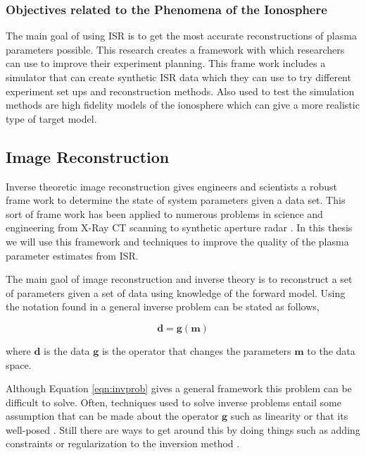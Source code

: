 \subsubsection{Objectives related to the Phenomena of the Ionosphere}
The main goal of using ISR is to get the most accurate reconstructions of plasma parameters possible. This research creates a framework with which researchers can use to improve their experiment planning. This frame work includes a simulator that can create synthetic ISR data which they can use to try different experiment set ups and reconstruction methods. Also used to test the simulation methods are high fidelity models of the ionosphere which can give a more realistic type of target model.

\subsection{Image Reconstruction}
Inverse theoretic image reconstruction gives engineers and scientists a robust frame work to determine the state of system parameters given a data set. This sort of frame work has been applied to numerous problems in science and engineering from X-Ray CT scanning \cite{kak1988principles} to synthetic aperture radar \cite{1456966}. In this thesis we will use this framework and techniques to improve the quality of the plasma parameter estimates from ISR.

The main gaol of image reconstruction and inverse theory is to reconstruct a set of parameters given a set of data using knowledge of the forward model. Using the notation found in \cite{menke2012geophysical} a general inverse problem can be stated as follows,

\begin{equation}
\label{eqn:invprob}
\mathbf{d}=\mathbf{g}(\mathbf{m})
\end{equation}

\noindent where $\mathbf{d}$ is the data $\mathbf{g}$ is the operator that changes the parameters $\mathbf{m}$ to the data space. 

Although Equation \ref{eqn:invprob} gives a general framework this problem can be difficult to solve. Often, techniques used to solve inverse problems entail some assumption that can be made about the operator $\mathbf{g}$ such as linearity or that its well-posed \cite{0266-5611-4-4-010}. Still there are ways to get around this by doing things such as adding constraints or regularization to the inversion method \cite{Vogel:2002:CMI:581830}.

